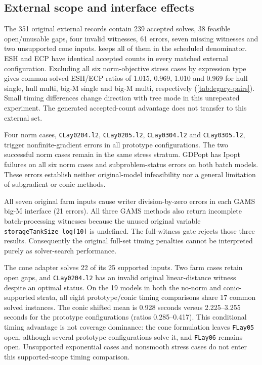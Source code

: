 \subsection{External scope and interface effects}\label{sec:external}
The 351 original external records contain 239 accepted solves, 38 feasible open/unusable gaps, four invalid witnesses, 61 errors, seven missing witnesses and two unsupported cone inputs.  keeps all of them in the scheduled denominator. ESH and ECP have identical accepted counts in every matched external configuration. Excluding all six norm-objective stress cases by expression type gives common-solved ESH/ECP ratios of 1.015, 0.969, 1.010 and 0.969 for hull single, hull multi, big-M single and big-M multi, respectively (\cref{tab:legacy-pairs}). Small timing differences change direction with tree mode in this unrepeated experiment. The generated accepted-count advantage does not transfer to this external set.
\begin{table}[tb]
\centering\small
\caption{Original external accepted counts, stratified by expression scope. The conic adapter supports 25/27 inputs; two exponential batch models are unsupported, not failed supported solves. Norm-objective cases are stress tests for the smooth oracle.}\label{tab:legacy}

\end{table}

Four norm cases, \texttt{CLay0204.l2}, \texttt{CLay0205.l2}, \texttt{CLay0304.l2} and \texttt{CLay0305.l2}, trigger nonfinite-gradient errors in all prototype configurations. The two successful norm cases remain in the same stress stratum. GDPopt has Ipopt failures on all six norm cases and subproblem-status errors on both batch models. These errors establish neither original-model infeasibility nor a general limitation of subgradient or conic methods.

All seven original farm inputs cause writer division-by-zero errors in each GAMS big-M interface (21 errors). All three GAMS methods also return incomplete batch-processing witnesses because the unused original variable \texttt{storageTankSize\_log[10]} is undefined. The full-witness gate rejects those three results. Consequently the original full-set timing penalties cannot be interpreted purely as solver-search performance.

The cone adapter solves 22 of its 25 supported inputs. Two farm cases retain open gaps, and \texttt{CLay0204.l2} has an invalid original linear-distance witness despite an optimal status. On the 19 models in both the no-norm and conic-supported strata, all eight prototype/conic timing comparisons share 17 common solved instances. The conic shifted mean is 0.928 seconds versus 2.225--3.255 seconds for the prototype configurations (ratios 0.285--0.417). This conditional timing advantage is not coverage dominance: the cone formulation leaves \texttt{FLay05} open, although several prototype configurations solve it, and \texttt{FLay06} remains open. Unsupported exponential cases and nonsmooth stress cases do not enter this supported-scope timing comparison.

